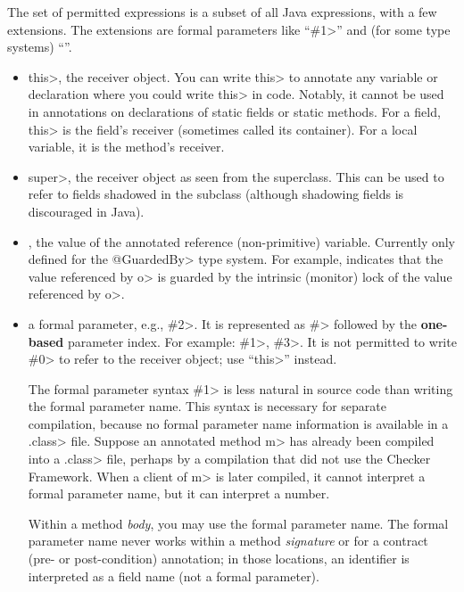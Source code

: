 The set of permitted expressions is a subset of all Java expressions,
with a few extensions.
The extensions are formal parameters like ``\<\#1>'' and (for some type
systems) ``''.

\begin{itemize}
\item
  \<this>, the receiver object.  You can write \<this> to annotate any
  variable or declaration where you could write \<this> in code.
  Notably, it cannot be used in annotations on declarations of
  static fields or static methods.  For a field, \<this> is the field's
  receiver (sometimes called its container).  For a local variable, it is the
  method's receiver.

\item
  \<super>, the receiver object as seen from the superclass.  This can be used
  to refer to fields shadowed in the subclass (although shadowing fields is
  discouraged in Java).

\item
  , the value of the annotated reference (non-primitive) variable.
  Currently only defined for the \<@GuardedBy> type system.
  For example,  indicates that the value
  referenced by \<o> is guarded by the intrinsic (monitor) lock of the value
  referenced by \<o>.

\item
  a formal parameter, e.g., \<\#2>.  It is represented as \<\#> followed by the \textbf{one-based} parameter
  index.  For example: \<\#1>, \<\#3>.  It is not permitted to write \<\#0> to
  refer to the receiver object; use ``\<this>'' instead.

  The formal parameter syntax \<\#1> is less natural in source code
  than writing the formal parameter name.  This syntax is necessary for
  separate compilation, because no formal parameter name information is
  available in a \<.class> file.  Suppose an annotated method \<m> has
  already been compiled into a \<.class> file, perhaps by a compilation
  that did not use the Checker Framework.  When a client of \<m> is later
  compiled, it cannot interpret a formal parameter name, but it can
  interpret a number.

  Within a method \emph{body}, you may use the formal parameter name.  The
  formal parameter name never works within a method \emph{signature} or for
  a contract (pre- or post-condition) annotation; in those locations, an
  identifier is interpreted as a field name (not a formal parameter).


\end{itemize}
